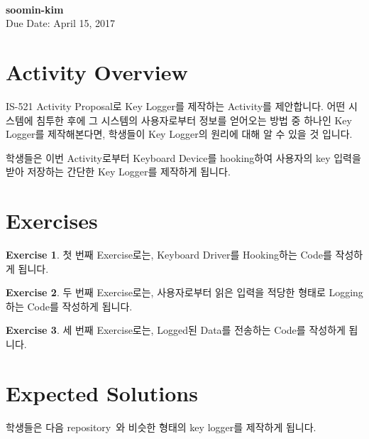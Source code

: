 \documentclass[a4paper, 11pt]{article}
\theoremstyle{definition}
\newtheorem{exercise}{Exercise}
\begin{document}
 \\
         {\phantom{} \hfill \textbf{soomin-kim}} \\
         {\phantom{} \hfill Due Date: April 15, 2017} \\

\section{Activity Overview}

IS-521 Activity Proposal로 Key Logger를 제작하는 Activity를 제안합니다. 어떤
시스템에 침투한 후에 그 시스템의 사용자로부터 정보를 얻어오는 방법 중 하나인
Key Logger를 제작해본다면, 학생들이 Key Logger의 원리에 대해 알 수 있을 것
입니다.

학생들은 이번 Activity로부터 Keyboard Device를 hooking하여 사용자의 key 입력을
받아 저장하는 간단한 Key Logger를 제작하게 됩니다.

\section{Exercises}

\begin{exercise}

  첫 번째 Exercise로는, Keyboard Driver를 Hooking하는 Code를 작성하게 됩니다.

\end{exercise}

\begin{exercise}

  두 번째 Exercise로는, 사용자로부터 읽은 입력을 적당한 형태로 Logging하는
  Code를 작성하게 됩니다.

\end{exercise}

\begin{exercise}

  세 번째 Exercise로는, Logged된 Data를 전송하는 Code를 작성하게 됩니다.

\end{exercise}

\section{Expected Solutions}

  학생들은 다음 repository~\cite{keylogger}와 비슷한 형태의 key logger를
  제작하게 됩니다.



\end{document}
